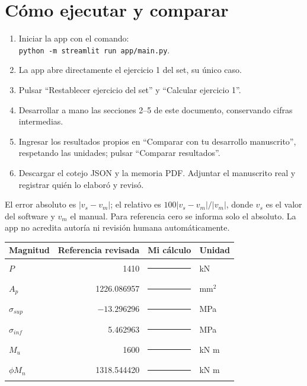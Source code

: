 \documentclass[11pt,a4paper]{article}
\begin{document}
\section{Cómo ejecutar y comparar}
\begin{enumerate}
\item Iniciar la app con el comando:\\ \texttt{python -m streamlit run app/main.py}.
\item La app abre directamente el ejercicio 1 del set, su único caso.
\item Pulsar ``Restablecer ejercicio del set'' y ``Calcular ejercicio 1''.
\item Desarrollar a mano las secciones 2--5 de este documento, conservando cifras intermedias.
\item Ingresar los resultados propios en ``Comparar con tu desarrollo manuscrito'', respetando las unidades; pulsar ``Comparar resultados''.
\item Descargar el cotejo JSON y la memoria PDF. Adjuntar el manuscrito real y registrar quién lo elaboró y revisó.
\end{enumerate}
El error absoluto es $|v_s-v_m|$; el relativo es $100|v_s-v_m|/|v_m|$, donde $v_s$ es el valor del software y $v_m$ el manual. Para referencia cero se informa solo el absoluto. La app no acredita autoría ni revisión humana automáticamente.

\begin{center}
\begin{tabular}{lrrl}
\toprule
Magnitud & Referencia revisada & Mi cálculo & Unidad\\
\midrule
$P$&1410&\rule{1.5cm}{0.2pt}&kN\\
$A_p$&1226.086957&\rule{1.5cm}{0.2pt}&mm$^2$\\
$\sigma_{sup}$&$-13.296296$&\rule{1.5cm}{0.2pt}&MPa\\
$\sigma_{inf}$&5.462963&\rule{1.5cm}{0.2pt}&MPa\\
$M_u$&1600&\rule{1.5cm}{0.2pt}&kN m\\
$\phi M_n$&1318.544420&\rule{1.5cm}{0.2pt}&kN m\\
\bottomrule
\end{tabular}
\end{center}
\end{document}
